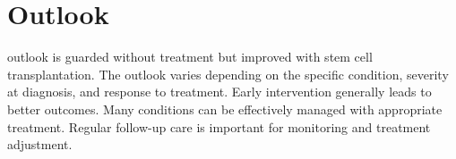 \section{Outlook}
outlook is guarded without treatment but improved with stem cell transplantation. The outlook varies depending on the specific condition, severity at diagnosis, and response to treatment. Early intervention generally leads to better outcomes. Many conditions can be effectively managed with appropriate treatment. Regular follow-up care is important for monitoring and treatment adjustment.
